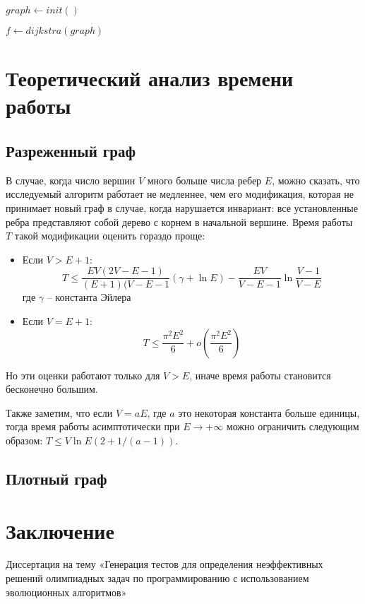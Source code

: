 \documentclass{spisok-article}
\begin{document}
\begin{algorithm}[H]
  
  $graph \gets init()$
  
  $f \gets dijkstra(graph)$
  
  \end{algorithm}


\section{Теоретический анализ времени работы}

\subsection{Разреженный граф}
В случае, когда число вершин $V$ много больше числа ребер $E$, можно сказать, что исследуемый алгоритм работает не медленнее, чем его модификация, которая не принимает новый граф в случае, когда нарушается инвариант: все установленные ребра представляют собой дерево с корнем в начальной вершине. Время работы $T$ такой модификации оценить гораздо проще:
\begin{itemize}
    \item Если $V > E + 1$:
    $$T \le \frac{EV(2V - E - 1)}{(E + 1)(V - E - 1}(\gamma + \ln E) - \frac{EV}{V - E - 1} \ln\frac{V - 1}{V - E}$$
    где $\gamma$ -- константа Эйлера
    \item Если $V = E + 1$:
    $$T \le \frac{\pi^2 E^2}{6} + o\left( \frac{\pi^2 E^2}{6} \right)$$
\end{itemize}
Но эти оценки работают только для $V > E$, иначе время работы становится бесконечно большим.

Также заметим, что если $V = aE$, где $a$ это некоторая константа больше единицы, тогда время работы асимптотически при $E \to +\infty$ можно ограничить следующим образом: $T \le V \ln{E} \left(2 + 1/(a - 1)\right)$.

\subsection{Плотный граф}

\section{Заключение}


\renewcommand\refname{Литература}
\begin{thebibliography}{8}

 Диссертация на тему «Генерация тестов для определения неэффективных решений олимпиадных задач по программированию с использованием эволюционных алгоритмов»

\end{thebibliography}
\end{document}
